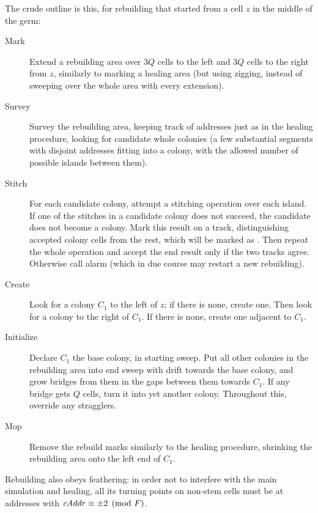 \documentclass[12pt]{memoir}
\newcommand{\fld}[1]{\ensuremath{\textit{#1\/}}}
\newcommand{\F}{F}
\newcommand{\cAddr}{\fld{cAddr}}
\begin{document}
The crude outline is this, for rebuilding that started from a cell \( z \) in the middle
of the germ:
\begin{description}
 \item[Mark] Extend a rebuilding area 
   over \( 3Q \) cells to the left and \( 3Q \) cells to the right 
   from \( z \), similarly to marking a healing area
   (but using zigging, instead of sweeping over the whole area with every extension).

 \item[Survey] Survey the rebuilding area, 
   keeping track of addresses just as in the healing procedure,
   looking for candidate whole colonies (a few substantial segments with disjoint 
   addresses fitting into a colony, with the allowed number of possible islands 
   between them).

 \item[Stitch] For each candidate colony, attempt a stitching operation over each island.
 If one of the stitches in a candidate colony does not succeed,
 the candidate does not become a colony.
 Mark this result on a track, distinguishing accepted colony cells from the
 rest, which will be marked as .
 Then repeat the whole operation and accept the end result only if the two tracks agree.
 Otherwise call alarm (which in due course may restart a new rebuilding).

\item[Create] Look for a colony \( C_{1} \) to the left of \( z \); if there is none,
  create one.
  Then look for a colony to the right of \( C_{1} \).
  If there is none, create one adjacent to \( C_{1} \).
 
\item[Initialize] 
  Declare \( C_{1} \) the base colony, in starting sweep.
  Put all other colonies in the rebuilding area
  into end sweep with drift towards the base colony, and
  grow bridges from them in the gaps between them towards \( C_{1} \).
  If any bridge gets \( Q \) cells, turn it into yet another colony.
  Throughout this, override any stragglers.

\item[Mop] Remove the rebuild marks similarly to the healing procedure,
  shrinking the rebuilding area onto the left end of \( C_{1} \).
\end{description}

Rebuilding also obeys feathering: in order not to interfere with the main simulation and healing,
all its turning points on non-stem cells
must be at addresses with \( \cAddr\equiv\pm 2\pmod{\F} \).
\end{document}
